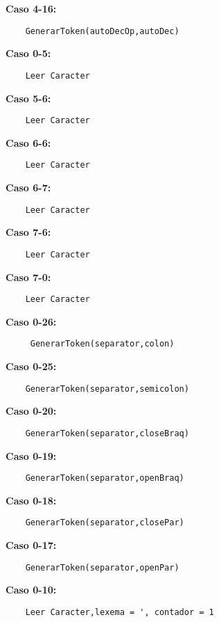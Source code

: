 \documentclass{article}
\begin{document}
\textbf{Caso 4-16:}
\begin{verbatim}
    GenerarToken(autoDecOp,autoDec)
\end{verbatim}

\textbf{Caso 0-5:}
\begin{verbatim}
    Leer Caracter
\end{verbatim}

\textbf{Caso 5-6:}
\begin{verbatim}
    Leer Caracter
\end{verbatim}

\textbf{Caso 6-6:}
\begin{verbatim}
    Leer Caracter
\end{verbatim}

\textbf{Caso 6-7:}
\begin{verbatim}
    Leer Caracter
\end{verbatim}
\newpage
\textbf{Caso 7-6:}
\begin{verbatim}
    Leer Caracter
\end{verbatim}

\textbf{Caso 7-0:}
\begin{verbatim}
    Leer Caracter
\end{verbatim}

\textbf{Caso 0-26:}
\begin{verbatim}
     GenerarToken(separator,colon)
\end{verbatim}

\textbf{Caso 0-25:}
\begin{verbatim}
    GenerarToken(separator,semicolon)
\end{verbatim}

\textbf{Caso 0-20:}
\begin{verbatim}
    GenerarToken(separator,closeBraq)
\end{verbatim}

\textbf{Caso 0-19:}
\begin{verbatim}
    GenerarToken(separator,openBraq)
\end{verbatim}

\textbf{Caso 0-18:}
\begin{verbatim}
    GenerarToken(separator,closePar)
\end{verbatim}

\textbf{Caso 0-17:}
\begin{verbatim}
    GenerarToken(separator,openPar)
\end{verbatim}
\newpage
\textbf{Caso 0-10:}
\begin{verbatim}
    Leer Caracter,lexema = ', contador = 1
\end{verbatim}
\end{document}
